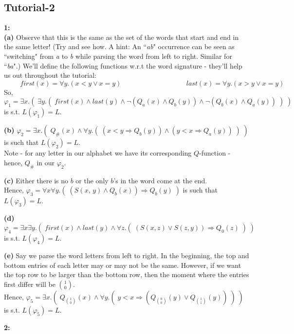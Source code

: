 \documentclass{article}
\begin{document}
\begin{flushleft}
\section{Tutorial-2}
\textbf{1:}\\
\textbf{(a)} Observe that this is the same as the set of the words that start and end in the same letter! (Try and see how. A hint: An ``\textit{ab}" occurrence can be seen as ``switching" from \textit{a} to \textit{b} while parsing the word from left to right. Similar for ``\textit{ba}".)
We'll define the following functions w.r.t the word signature - they'll help us out throughout the tutorial:\newline
$\hspace{1cm} first(x) = \forall y.(x < y \lor x = y) \hspace{4cm}
last(x) = \forall y.(x > y \lor x = y)$ \\
So, $\varphi_1 = \exists x.(\;\exists y.(\;first(x) \land last(y) \land \neg(Q_a(x) \land Q_b(y)) \land \neg(Q_b(x) \land Q_a(y))\;)\;)$ is s.t. $L(\varphi_1) = L$.

\textbf{(b)} $\varphi_2 = \exists x.(\;Q_\#(x) \land \forall y.(\;(x < y \Rightarrow Q_b(y)) \land (y < x \Rightarrow Q_a(y))\;)\;)$ is such that $L(\varphi_2) = L$.\\
Note - for any letter in our alphabet we have its corresponding $Q$-function - hence, $Q_\#$ in our $\varphi_2$.

\textbf{(c)} Either there is no $b$ or the only $b$'s in the word come at the end.\\
Hence, $\varphi_3 = \forall x \forall y.(\; (S(x,\, y) \land Q_b(x)) \Rightarrow Q_b(y)\;)$ is such that $L(\varphi_3) = L$.

\textbf{(d)} $\varphi_4 = \exists x \exists y.(\; first(x) \land last(y) \land \forall z.(\; (S(x, z) \lor S(z, y)) \Rightarrow Q_0(z)\;)\;)$ is s.t. $L(\varphi_4) = L$.

\textbf{(e)} Say we parse the word letters from left to right. In the beginning, the top and bottom entries of each letter may or may not be the same. However, if we want the top row to be larger than the bottom row, then the moment where the entries first differ will be $1 \choose 0$.\\ 
Hence, $\varphi_5 = \exists x.(\;Q_{1 \choose 0}(x) \land \forall y.(\; y < x \Rightarrow (Q_{0 \choose 0}(y) \lor Q_{1 \choose 1}(y))\;)\;)$ is s.t. $L(\varphi_5) = L$.

\textbf{2:}\\


\end{flushleft}
\end{document}
